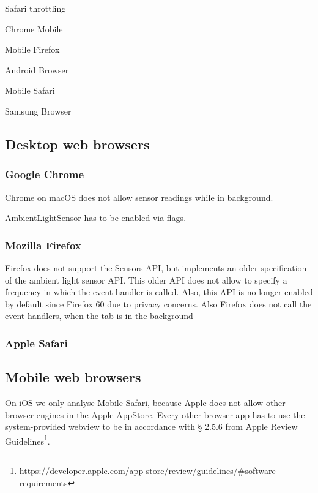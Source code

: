 \documentclass[article,type=bsc,colorback,accentcolor=tud9c]{tudthesis}
\begin{document}
  Safari throttling



  Chrome Mobile

  Mobile Firefox

  Android Browser

  Mobile Safari

  Samsung Browser

  
  
  \subsection{Desktop web browsers}

  \subsubsection{Google Chrome}

  Chrome on macOS does not allow sensor readings while in background.

  AmbientLightSensor has to be enabled via flags.
  
  \subsubsection{Mozilla Firefox}

  Firefox does not support the Sensors API, but implements an older specification of the ambient light sensor API. This older API does not allow to specify a frequency in which the event handler is called. Also, this API is no longer enabled by default since Firefox 60 due to privacy concerns. Also Firefox does not call the event handlers, when the tab is in the background

  \subsubsection{Apple Safari}

  \subsection{Mobile web browsers}

  On iOS we only analyse Mobile Safari, because Apple does not allow other browser engines in the Apple AppStore. Every other browser app has to use the system-provided webview to be in accordance with § 2.5.6 from Apple Review Guidelines\footnote{\url{https://developer.apple.com/app-store/review/guidelines/\#software-requirements}}.
\end{document}
